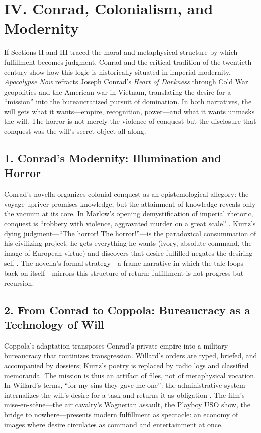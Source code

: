 \section*{IV. Conrad, Colonialism, and Modernity}
\label{sec:iv-conrad-colonialism-and-modernity}

If Sections II and III traced the moral and metaphysical structure by which fulfillment becomes judgment, Conrad and the critical tradition of the twentieth century show how this logic is historically situated in imperial modernity. \textit{Apocalypse Now} refracts Joseph Conrad’s \textit{Heart of Darkness} through Cold War geopolitics and the American war in Vietnam, translating the desire for a ``mission'' into the bureaucratized pursuit of domination. In both narratives, the will gets what it wants---empire, recognition, power---and what it wants unmasks the will. The horror is not merely the violence of conquest but the disclosure that conquest was the will’s secret object all along.

\subsection*{1. Conrad’s Modernity: Illumination and Horror}
\label{ssec:1-conrad-s-modernity-illumination-and-horror}
Conrad’s novella organizes colonial conquest as an epistemological allegory: the voyage upriver promises knowledge, but the attainment of knowledge reveals only the vacuum at its core. In Marlow’s opening demystification of imperial rhetoric, conquest is ``robbery with violence, aggravated murder on a great scale'' \parencite[ConradHOD1990]{ConradHOD1990}. Kurtz’s dying judgment---``The horror! The horror!''---is the paradoxical consummation of his civilizing project: he gets everything he wants (ivory, absolute command, the image of European virtue) and discovers that desire fulfilled negates the desiring self \parencite{ConradHOD1990}. The novella’s formal strategy---a frame narrative in which the tale loops back on itself---mirrors this structure of return: fulfillment is not progress but recursion.

\subsection*{2. From Conrad to Coppola: Bureaucracy as a Technology of Will}
\label{ssec:2-from-conrad-to-coppola-bureaucracy-as-a-technology-of-will}
Coppola’s adaptation transposes Conrad’s private empire into a military bureaucracy that routinizes transgression. Willard’s orders are typed, briefed, and accompanied by dossiers; Kurtz’s poetry is replaced by radio logs and classified memoranda. The mission is thus an artifact of files, not of metaphysical vocation. In Willard’s terms, ``for my sins they gave me one'': the administrative system internalizes the will’s desire for a task and returns it as obligation \parencite{CoppolaApocalypse1979}. The film’s mise-en-scène—the air cavalry’s Wagnerian assault, the Playboy USO show, the bridge to nowhere—presents modern fulfillment as spectacle: an economy of images where desire circulates as command and entertainment at once.

